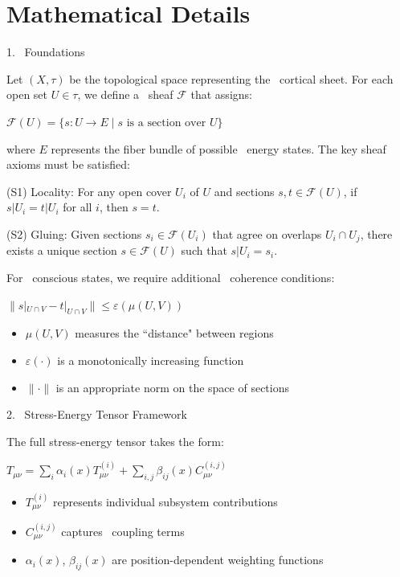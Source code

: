 \section{Mathematical Details}

1.~ Foundations

Let $(X,\tau)$ be the topological space representing the~ cortical sheet. For each open set $U \in \tau$, we define a~ sheaf $\mathcal{F}$ that assigns:

$\mathcal{F}(U) = \{s: U \rightarrow E \mid s \text{ is a section over } U\}$

where $E$ represents the fiber bundle of possible~ energy states. The key sheaf axioms must be satisfied:

(S1) Locality: For any open cover ${U_i}$ of $U$ and sections $s,t \in \mathcal{F}(U)$, if $s|U_i = t|U_i$ for all $i$, then $s = t$.

(S2) Gluing: Given sections $s_i \in \mathcal{F}(U_i)$ that agree on overlaps $U_i \cap U_j$, there exists a unique section $s \in \mathcal{F}(U)$ such that $s|U_i = s_i$.

For~ conscious states, we require additional~ coherence conditions:

$\|s|_{U \cap V} - t|_{U \cap V}\| \leq \varepsilon(\mu(U,V))$

\begin{itemize}
  \item $\mu(U,V)$ measures the ``distance" between regions
  \item $\varepsilon(\cdot)$ is a monotonically increasing function
  \item $\|\cdot\|$ is an appropriate norm on the space of sections
\end{itemize}

2.~ Stress-Energy Tensor Framework

The full stress-energy tensor takes the form:

$T_{\mu\nu} = \sum_i \alpha_i(x)T^{(i)}_{\mu\nu} + \sum_{i,j} \beta_{ij}(x)C^{(i,j)}_{\mu\nu}$

\begin{itemize}
  \item $T^{(i)}_{\mu\nu}$ represents individual subsystem contributions
  \item $C^{(i,j)}_{\mu\nu}$ captures~ coupling terms
  \item $\alpha_i(x)$, $\beta_{ij}(x)$ are position-dependent weighting functions
\end{itemize}

